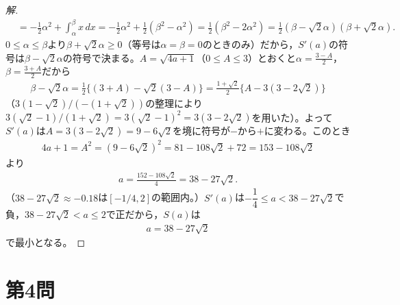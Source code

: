 \documentclass[../main.tex]{subfiles}
\begin{document}
\begin{proof}[解]
\begin{align*}
    &=-\frac12\alpha^2+\int_\alpha^\beta x\,dx=-\frac12\alpha^2+\frac12(\beta^2-\alpha^2)=\frac12(\beta^2-2\alpha^2)=\frac12(\beta-\sqrt2\alpha)(\beta+\sqrt2\alpha).\tag{②}
  \end{align*}
  $0\le\alpha\le\beta$より$\beta+\sqrt2\alpha\ge0$（等号は$\alpha=\beta=0$のときのみ）だから，$S'(a)$の符号は$\beta-\sqrt2\alpha$の符号で決まる。$A=\sqrt{4a+1}$（$0\le A\le3$）とおくと$\alpha=\frac{3-A}2$，$\beta=\frac{3+A}2$だから
  \begin{align*}
    \beta-\sqrt2\alpha=\frac12\bigl\{(3+A)-\sqrt2(3-A)\bigr\}=\frac{1+\sqrt2}2\bigl\{A-3(3-2\sqrt2)\bigr\}
  \end{align*}
  （$3(1-\sqrt2)/(-(1+\sqrt2))$の整理により$3(\sqrt2-1)/(1+\sqrt2)=3(\sqrt2-1)^2=3(3-2\sqrt2)$を用いた）。よって$S'(a)$は$A=3(3-2\sqrt2)=9-6\sqrt2$を境に符号が$-$から$+$に変わる。このとき
  \begin{align*}
    4a+1=A^2=(9-6\sqrt2)^2=81-108\sqrt2+72=153-108\sqrt2
  \end{align*}
  より
  \begin{align*}
    a=\frac{152-108\sqrt2}4=38-27\sqrt2.
  \end{align*}
  （$38-27\sqrt2\approx-0.18$は$[-1/4,2]$の範囲内。）$S'(a)$は$-\dfrac14\le a<38-27\sqrt2$で負，$38-27\sqrt2<a\le2$で正だから，$S(a)$は
  \begin{align*}
    a=38-27\sqrt2
  \end{align*}
  で最小となる。
\end{proof}

\newpage

\section*{第4問}
\end{document}
